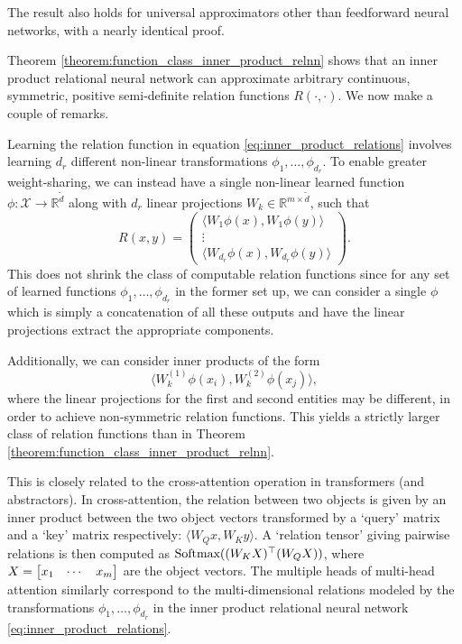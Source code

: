 \begin{remark}
	The result also holds for universal approximators other than feedforward neural networks, with a nearly identical proof.
\end{remark}

Theorem \ref{theorem:function_class_inner_product_relnn} shows that an inner product relational neural network can approximate arbitrary continuous, symmetric, positive semi-definite relation functions \(R(\cdot, \cdot)\). We now make a couple of remarks.

Learning the relation function in equation \eqref{eq:inner_product_relations} involves learning \(d_r\) different non-linear transformations \(\phi_{1}, \ldots, \phi_{d_r}\). To enable greater weight-sharing, we can instead have a single non-linear learned function \(\phi: \mathcal{X} \to \mathbb{R}^{\tilde{d}}\) along with \(d_r\) linear projections \(W_k \in \mathbb{R}^{m \times \tilde{d}}\), such that
\begin{equation}
	\label{eq:weight_sharing_inner_product_relnn}
	R(x,y) = \begin{pmatrix}\langle W_1 \phi(x), W_1 \phi(y) \rangle \\ \vdots \\ \langle W_{d_r}\phi(x), W_{d_r}\phi(y) \rangle\end{pmatrix}.
\end{equation}
This does not shrink the class of computable relation functions since for any set of learned functions \(\phi_1, \ldots, \phi_{d_r}\) in the former set up, we can consider a single \(\phi\) which is simply a concatenation of all these outputs and have the linear projections extract the appropriate components.

Additionally, we can consider inner products of the form
\begin{equation}
	\label{eq:nonsymmetric_inner_product_relnn}
	\langle W_k^{(1)} \phi(x_i), W_k^{(2)} \phi(x_j) \rangle,
\end{equation}
\noindent where the linear projections for the first and second entities may be different, in order to achieve non-symmetric relation functions. This yields a strictly larger class of relation functions than in Theorem \ref{theorem:function_class_inner_product_relnn}.

This is closely related to the cross-attention operation in transformers (and  abstractors). In cross-attention, the relation between two objects is given by an inner product between the two object vectors transformed by a `query' matrix and a `key' matrix respectively: \(\langle W_Q x, W_K y \rangle\). A `relation tensor' giving pairwise relations is then computed as \(\text{Softmax}((W_K X)^\top (W_Q X))\), where \(X = \begin{bmatrix} x_1 & \cdots & x_m\end{bmatrix}\) are the object vectors. The multiple heads of multi-head attention similarly correspond to the multi-dimensional relations modeled by the transformations \(\phi_{1}, \ldots, \phi_{d_r}\) in the inner product relational neural network \ref{eq:inner_product_relations}.

